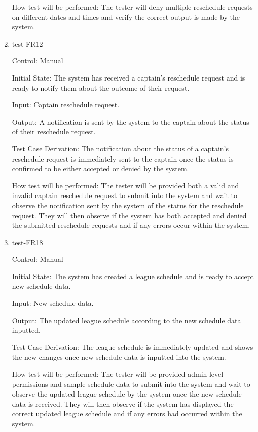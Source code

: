 \documentclass[12pt, titlepage]{article}
\begin{document}
\begin{enumerate}
  How test will be performed: The tester will deny multiple reschedule
  requests on different dates and times and verify the correct output is made by
  the system.

  \item{test-FR12\\}

  Control: Manual

  Initial State: The system has received a captain's reschedule request and is ready to
  notify them about the outcome of their request.

  Input: Captain reschedule request.

  Output: A notification is sent by the system to the captain about the status of their
  reschedule request.

  Test Case Derivation: The notification about the status of a captain's reschedule
  request is immediately sent to the captain once the status is confirmed to be either
  accepted or denied by the system.

  How test will be performed: The tester will be provided both a valid and invalid captain
  reschedule request to submit into the system and wait to observe the notification sent
  by the system of the status for the reschedule request. They will then observe if the
  system has both accepted and denied the submitted reschedule requests and if any errors
  occur within the system. 

  \item{test-FR18\\}

  Control: Manual

  Initial State: The system has created a league schedule and is ready to
  accept new schedule data.

  Input: New schedule data.

  Output: The updated league schedule according to the new schedule data inputted.

  Test Case Derivation: The league schedule is immediately updated and shows the new changes
  once new schedule data is inputted into the system.

  How test will be performed: The tester will be provided admin level permissions and sample
  schedule data to submit into the system and wait to observe the updated league schedule
  by the system once the new schedule data is received. They will then observe if the
  system has displayed the correct updated league schedule and if any errors had
  occurred within the system.


\end{enumerate}
\end{document}
